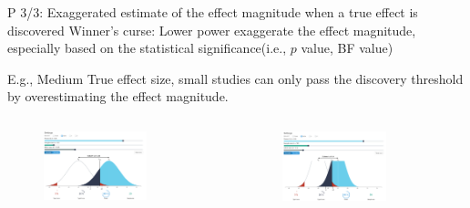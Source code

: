 \documentclass{beamer}
\begin{document}
	\begin{frame}{P 3/3: Exaggerated estimate of the effect magnitude when a true effect is discovered}
		\fontsize{10pt}{12pt}\selectfont
		Winner's curse: Lower power exaggerate the effect magnitude, especially based on the statistical significance(i.e., $p$ value, BF value)
		
		\fontsize{10pt}{12pt}\selectfont
		E.g., Medium True effect size, small studies can only pass the discovery threshold by overestimating the effect magnitude.
		
		\begin{columns}
			\begin{figure}[H]
				\centering
				\includegraphics[width=0.7\textwidth]{pics/effect size small sample.png}
			\end{figure}
			\begin{figure}[H]
				\centering
				\includegraphics[width=0.7\textwidth]{pics/effect size large sample.png}
			\end{figure}
		\end{columns}	
	\end{frame}
	
\end{document}
